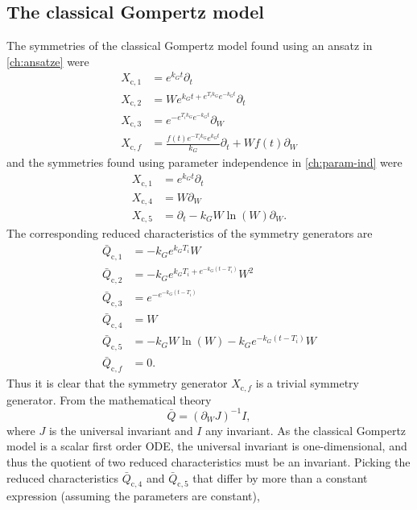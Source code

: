 \subsection{The classical Gompertz model}

The symmetries of the classical Gompertz model found using an ansatz in \cref{ch:ansatze} were
\begin{align}
  X_{\text{c},1} &= e^{k_{G} t} \partial_t \\
  X_{\text{c},2} &= W e^{k_{G} t + e^{T_{i} k_{G}} e^{- k_{G} t}} \partial_t \\
  X_{\text{c},3} &= e^{- e^{T_{i} k_{G}} e^{- k_{G} t}} \partial_W \\
  X_{\text{c},f} &= \frac{f{\left(t \right)} e^{- T_{i} k_{G}} e^{k_{G} t}}{k_{G}} \partial_t + W f{\left(t \right)} \partial_W
\end{align}
and the symmetries found using parameter independence in \cref{ch:param-ind} were
\begin{align}
  X_{\text{c},1} &= e^{k_G t} \partial_t \\
  X_{\text{c},4} &= W \partial_W \\
  X_{\text{c},5} &= \partial_t - k_G W \ln(W) \partial_W.
\end{align}
The corresponding reduced characteristics of the symmetry generators are
\begin{align}
  \bar{Q}_{\text{c},1} &= -k_G e^{k_G T_i} W \\
  \bar{Q}_{\text{c},2} &= - k_G e^{k_{G} T_i + e^{-k_G (t - T_i)}} W^2 \\
  \bar{Q}_{\text{c},3} &= e^{- e^{- k_{G} \left(t - T_{i}\right)}} \\
  \bar{Q}_{\text{c},4} &= W \\
  \bar{Q}_{\text{c},5} &= - k_G W \ln(W) - k_G e^{-k_G (t - T_i)} W \\
  \bar{Q}_{\text{c},f} &= 0.
\end{align}
Thus it is clear that the symmetry generator \(X_{\text{c},f}\) is a trivial symmetry generator.
From the mathematical theory
\begin{equation}
  \bar{Q} = (\partial_W J)^{-1} I,
\end{equation}
where \(J\) is the universal invariant and \(I\) any invariant.
As the classical Gompertz model is a scalar first order ODE, the universal invariant is one-dimensional, and thus the quotient of two reduced characteristics must be an invariant.
Picking the reduced characteristics \(\bar{Q}_{\text{c},4}\) and \(\bar{Q}_{\text{c},5}\) that differ by more than a constant expression (assuming the parameters are constant),
